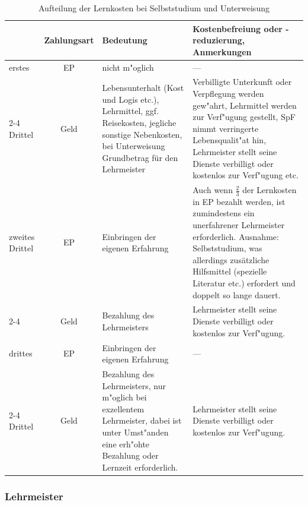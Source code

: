 \documentclass[10pt,a4paper,germanpar]{article}
\begin{document}
\begin{table}[htbp]
  \begin{center}

    {\footnotesize 
      \begin{tabular}{|p{1cm}|c|p{5cm}|p{7.5cm}|}
        \hline
        & \textbf{Zahlungsart}& \textbf{Bedeutung}
        & \textbf{Kostenbefreiung oder -reduzierung,
          Anmerkungen} \\
        \hline
        erstes& EP & nicht m"oglich& --- \\
        \cline{2-4}
        Drittel & Geld & Lebensunterhalt (Kost und Logis etc.), Lehrmittel,
        ggf. Reisekosten, jegliche sonstige Nebenkosten, bei
        Unterweisung Grundbetrag für den Lehrmeister & Verbilligte
        Unterkunft oder Verpflegung werden gew"ahrt, Lehrmittel werden zur
        Verf"ugung gestellt, SpF nimmt verringerte Lebensqualit"at hin,
        Lehrmeister stellt seine Dienste verbilligt
        oder kostenlos zur Verf"ugung etc.\\
        \hline
        zweites Drittel & EP & Einbringen der eigenen Erfahrung & Auch wenn
        $\frac{2}{3}$ der Lernkosten in EP bezahlt werden, ist zumindestens ein 
        unerfahrener Lehrmeister erforderlich. Ausnahme:
        Selbststudium, was allerdings zusätzliche Hilfsmittel (spezielle
        Literatur etc.)
        erfordert und doppelt so lange dauert.\\
        \cline{2-4}
        & Geld & Bezahlung des Lehrmeisters & Lehrmeister stellt seine Dienste verbilligt
        oder kostenlos zur Verf"ugung. \\
        \hline
        drittes & EP &  Einbringen der eigenen Erfahrung & ---\\
        \cline{2-4}
        Drittel & Geld & Bezahlung des Lehrmeisters, nur m"oglich bei
        exzellentem Lehrmeister, dabei ist unter Umst"anden eine erh"ohte
        Bezahlung oder Lernzeit erforderlich. & Lehrmeister stellt seine Dienste verbilligt
        oder kostenlos zur Verf"ugung. \\
        \hline
      \end{tabular}
      }

    \caption{Aufteilung der Lernkosten bei Selbststudium und Unterweisung}
    \label{tab:lernkosten}
  \end{center}
\end{table}

\subsubsection{Lehrmeister}
\end{document}
